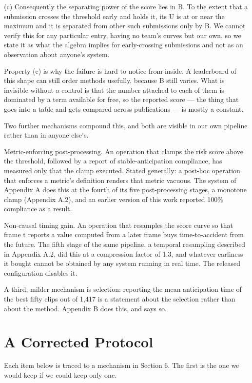 (c) Consequently the separating power of the score lies in B. To the extent that a submission crosses the threshold early and holds it, its U is at or near the maximum and it is separated from other such submissions only by B. We cannot verify this for any particular entry, having no team's curves but our own, so we state it as what the algebra implies for early-crossing submissions and not as an observation about anyone's system.

Property (c) is why the failure is hard to notice from inside. A leaderboard of this shape can still order methods usefully, because B still varies. What is invisible without a control is that the number attached to each of them is dominated by a term available for free, so the reported score --- the thing that goes into a table and gets compared across publications --- is mostly a constant.

Two further mechanisms compound this, and both are visible in our own pipeline rather than in anyone else's.

Metric-enforcing post-processing. An operation that clamps the risk score above the threshold, followed by a report of stable-anticipation compliance, has measured only that the clamp executed. Stated generally: a post-hoc operation that enforces a metric's definition renders that metric vacuous. The system of Appendix A does this at the fourth of its five post-processing stages, a monotone clamp (Appendix A.2), and an earlier version of this work reported 100\% compliance as a result.

Non-causal timing gain. An operation that resamples the score curve so that frame t reports a value computed from a later frame buys time-to-accident from the future. The fifth stage of the same pipeline, a temporal resampling described in Appendix A.2, did this at a compression factor of 1.3, and whatever earliness it bought cannot be obtained by any system running in real time. The released configuration disables it.

A third, milder mechanism is selection: reporting the mean anticipation time of the best fifty clips out of 1,417 is a statement about the selection rather than about the method. Appendix B does this, and says so.


\section{A Corrected Protocol}

Each item below is traced to a mechanism in Section 6. The first is the one we would keep if we could keep only one.

